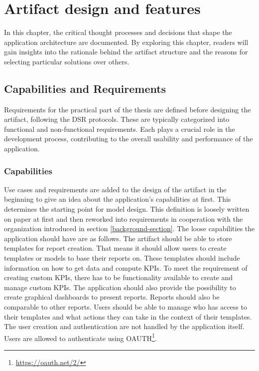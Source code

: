 \chapter{Artifact design and features}
\label{Chapter5} 

In this chapter, the critical thought processes and decisions 
that shape the application architecture are documented. 
By exploring this chapter, readers will gain insights into the rationale behind the artifact structure and the reasons for selecting particular solutions over others.

\section{Capabilities and Requirements} 
\label{Requirements}

Requirements for the practical part of the thesis are defined before designing the artifact, following the DSR protocols. 
These are typically categorized into functional and non-functional requirements. 
Each plays a crucial role in the development process, 
contributing to the overall usability and performance of the application.

\subsection{Capabilities}

Use cases and requirements are added to the design of the 
artifact in the beginning to give an idea about the application's capabilities at first. 
This determines the starting point for model design. 
This definition is loosely written on paper at first and then reworked into 
requirements in cooperation with the organization introduced in section \ref{background-section}. 
The loose capabilities the application should have are as follows.
The artifact should be able to store templates for report creation. 
That means it should allow users to create templates or models to base their reports on. 
These templates should include information on how to get data and compute KPIs. 
To meet the requirement of creating custom KPIs, there has to be functionality available to create and manage custom KPIs.
The application should also provide the possibility to create graphical dashboards to 
present reports. 
Reports should also be comparable to other reports. 
Users should be able to manage who has access to their templates 
and what actions they can take in the context of their templates. 
The user creation and authentication are not handled by the application itself. 
Users are allowed to authenticate using OAUTH\footnote{\url{https://oauth.net/2/}}.

